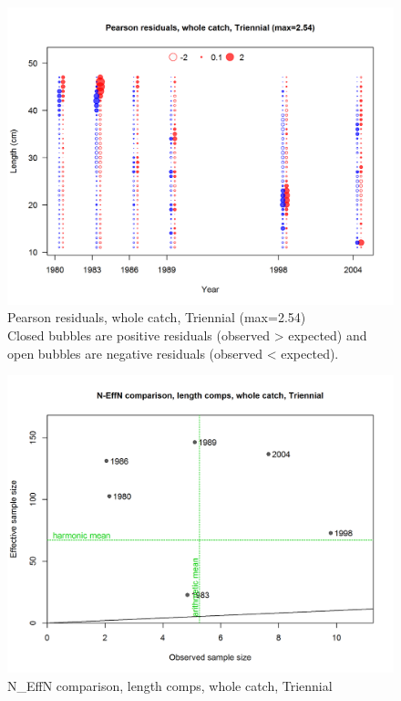 \documentclass[12pt,]{article}
\begin{document}
\begin{figure}
\centering
\includegraphics{./r4ss/plots_mod1/comp_lenfit_residsflt5mkt0.png}
\caption{Pearson residuals, whole catch, Triennial (max=2.54)\\
Closed bubbles are positive residuals (observed \textgreater{} expected)
and open bubbles are negative residuals (observed \textless{} expected).
\label{fig:mod1_19_comp_lenfit_residsflt5mkt0}}
\end{figure}

\begin{figure}
\centering
\includegraphics{./r4ss/plots_mod1/comp_lenfit_sampsize_flt5mkt0.png}
\caption{N\_EffN comparison, length comps, whole catch, Triennial
\label{fig:mod1_20_comp_lenfit_sampsize_flt5mkt0}}
\end{figure}
\end{document}
